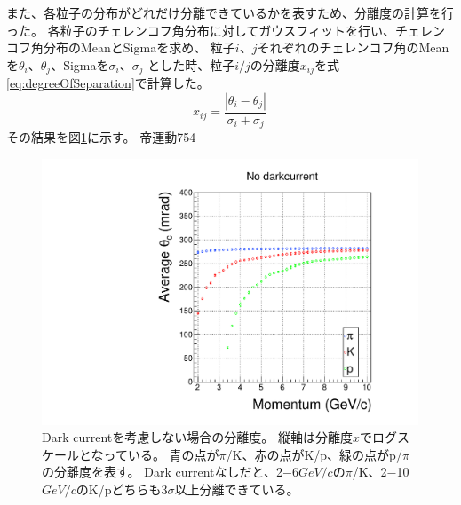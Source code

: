 また、各粒子の分布がどれだけ分離できているかを表すため、分離度の計算を行った。
各粒子のチェレンコフ角分布に対してガウスフィットを行い、チェレンコフ角分布のMeanとSigmaを求め、
粒子$i$、$j$それぞれのチェレンコフ角のMeanを$\theta_{i}$、$\theta_{j}$、Sigmaを$\sigma_{i}$、$\sigma_{j}$
とした時、粒子$i/j$の分離度$x_{ij}$を式\ref{eq:degreeOfSeparation}で計算した。
\begin{equation}
  x_{ij} = \frac{\left|\theta_{i} - \theta_{j}\right|}{\sigma_{i} + \sigma_{j}}
  \label{eq:degreeOfSeparation}
\end{equation}
その結果を図\ref{fig:angleMultiGraph3}に示す。
帝運動754

\begin{figure}[htbp]
  \centering
  \includegraphics[width=15cm,page=29]{images/chapter4/angleAndMultiGraph.pdf}
  \caption{
    Dark currentを考慮しない場合の分離度。
    縦軸は分離度$x$でログスケールとなっている。
    青の点が$\pi$/K、赤の点がK/p、緑の点がp/$\pi$の分離度を表す。
    Dark currentなしだと、2$-$6\space$\si{GeV/c}$の$\pi$/K、2$-$10\space$\si{GeV/c}$のK/pどちらも$3\sigma$以上分離できている。
  }
  \label{fig:angleMultiGraph3}
\end{figure}

